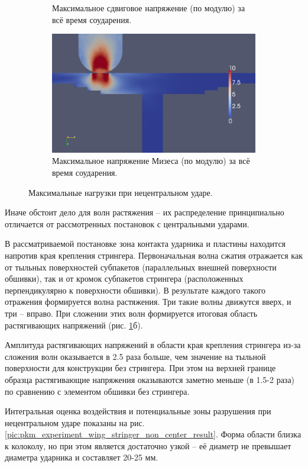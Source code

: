 \begin{figure}[h]
\begin{subfigure}[b]{0.5\textwidth}
\caption{Максимальное сдвиговое напряжение (по модулю) за всё время соударения.}
\end{subfigure}
\begin{subfigure}[b]{0.5\textwidth}
\centering
\includegraphics[width=\textwidth]{png/pkm-experiment/wing-stringer-non-center/mises.png}
\caption{Максимальное напряжение Мизеса (по модулю) за всё время соударения.}
\end{subfigure}
\caption{Максимальные нагрузки при нецентральном ударе.}
\label{pic:pkm_experiment_non_center}
\end{figure}

Иначе обстоит дело для волн растяжения -- их распределение принципиально отличается от рассмотренных постановок с центральными ударами.

В рассматриваемой постановке зона контакта ударника и пластины находится напротив края крепления стрингера. Первоначальная волна сжатия отражается как от тыльных поверхностей субпакетов (параллельных внешней поверхности обшивки), так и от кромок субпакетов стрингера (расположенных перпендикулярно к поверхности обшивки). В результате каждого такого отражения формируется волна растяжения. Три такие волны движутся вверх, и три -- вправо. При сложении этих волн формируется итоговая область растягивающих напряжений (рис. \ref{pic:pkm_experiment_non_center}б).

Амплитуда растягивающих напряжений в области края крепления стрингера из-за сложения волн оказывается в 2.5 раза больше, чем значение на тыльной поверхности для конструкции без стрингера. При этом на верхней границе образца растягивающие напряжения оказываются заметно меньше (в 1.5-2 раза) по сравнению с элементом обшивки без стрингера.

Интегральная оценка воздействия и потенциальные зоны разрушения при нецентральном ударе показаны на рис. \ref{pic:pkm_experiment_wing_stringer_non_center_result}. Форма области близка к колоколу, но при этом является достаточно узкой -- её диаметр не превышает диаметра ударника и составляет 20-25 мм.


